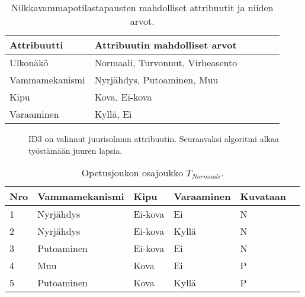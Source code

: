 \documentclass[12pt,finnish]{tktltiki2}
\theoremstyle{definition}
\theoremstyle{remark}
\begin{document}
\begin{table}
\centering
\begin{tabular}[H]{ | l | l | l | l | l | p{2cm} |} \hline
    \textbf{Attribuutti} & \textbf{Attribuutin mahdolliset arvot} \\ \hline
    Ulkonäkö & Normaali, Turvonnut, Virheasento \\ \hline
    Vammamekanismi & Nyrjähdys, Putoaminen, Muu \\ \hline
    Kipu & Kova, Ei-kova \\ \hline
    Varaaminen & Kyllä, Ei \\ \hline
\end{tabular} 
\caption{Nilkkavammapotilastapausten mahdolliset attribuutit ja niiden arvot.}
\label{table:NilkkavammapotilastapautenAttribuutitJaArvot}
\end{table}

\begin{figure}
\centering
{}
\caption{ID3 on valinnut juurisolmun attribuutin. Seuraavaksi algoritmi alkaa työstämään juuren lapsia.}
\label{fig:NilkkavammaPaatospuuJuuri}
\end{figure}



\begin{table}
\centering
    \begin{tabular}{ | l | l | l | l | l | p{2cm} |} \hline
    \textbf{Nro} & \textbf{Vammamekanismi} & \textbf{Kipu} & \textbf{Varaaminen} & \textbf{Kuvataan} \\ \hline
    1 & Nyrjähdys & Ei-kova & Ei & N \\ \hline
    2 & Nyrjähdys & Ei-kova & Kyllä & N \\ \hline
    3 & Putoaminen & Ei-kova & Ei & N \\ \hline
    4 & Muu & Kova & Ei & P \\ \hline
    5 & Putoaminen & Kova & Kyllä & P \\ \hline
    \end{tabular}
\caption{Opetusjoukon osajoukko $T_{Normaali}$.}
\label{table:OsajoukkoTNormaali}
\end{table}
\end{document}
